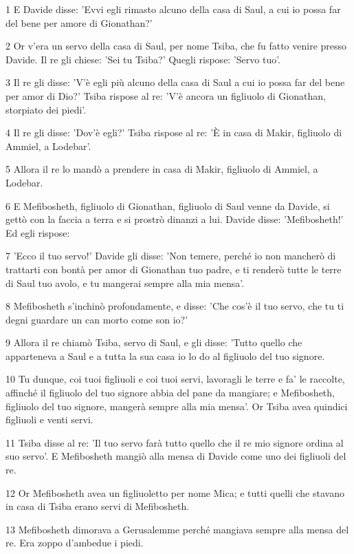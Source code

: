 \par 1 E Davide disse: 'Evvi egli rimasto alcuno della casa di Saul, a cui io possa far del bene per amore di Gionathan?'
\par 2 Or v'era un servo della casa di Saul, per nome Tsiba, che fu fatto venire presso Davide. Il re gli chiese: 'Sei tu Tsiba?' Quegli rispose: 'Servo tuo'.
\par 3 Il re gli disse: 'V'è egli più alcuno della casa di Saul a cui io possa far del bene per amor di Dio?' Tsiba rispose al re: 'V'è ancora un figliuolo di Gionathan, storpiato dei piedi'.
\par 4 Il re gli disse: 'Dov'è egli?' Tsiba rispose al re: 'È in casa di Makir, figliuolo di Ammiel, a Lodebar'.
\par 5 Allora il re lo mandò a prendere in casa di Makir, figliuolo di Ammiel, a Lodebar.
\par 6 E Mefibosheth, figliuolo di Gionathan, figliuolo di Saul venne da Davide, si gettò con la faccia a terra e si prostrò dinanzi a lui. Davide disse: 'Mefibosheth!' Ed egli rispose:
\par 7 'Ecco il tuo servo!' Davide gli disse: 'Non temere, perché io non mancherò di trattarti con bontà per amor di Gionathan tuo padre, e ti renderò tutte le terre di Saul tuo avolo, e tu mangerai sempre alla mia mensa'.
\par 8 Mefibosheth s'inchinò profondamente, e disse: 'Che cos'è il tuo servo, che tu ti degni guardare un can morto come son io?'
\par 9 Allora il re chiamò Tsiba, servo di Saul, e gli disse: 'Tutto quello che apparteneva a Saul e a tutta la sua casa io lo do al figliuolo del tuo signore.
\par 10 Tu dunque, coi tuoi figliuoli e coi tuoi servi, lavoragli le terre e fa' le raccolte, affinché il figliuolo del tuo signore abbia del pane da mangiare; e Mefibosheth, figliuolo del tuo signore, mangerà sempre alla mia mensa'. Or Tsiba avea quindici figliuoli e venti servi.
\par 11 Tsiba disse al re: 'Il tuo servo farà tutto quello che il re mio signore ordina al suo servo'. E Mefibosheth mangiò alla mensa di Davide come uno dei figliuoli del re.
\par 12 Or Mefibosheth avea un figliuoletto per nome Mica; e tutti quelli che stavano in casa di Tsiba erano servi di Mefibosheth.
\par 13 Mefibosheth dimorava a Gerusalemme perché mangiava sempre alla mensa del re. Era zoppo d'ambedue i piedi.

